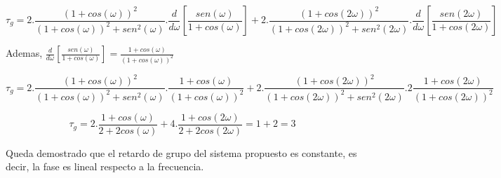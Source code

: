 \documentclass[../../ASSD_TP1_G7.tex]{subfiles}
\begin{document}
$$\tau_g =2.\frac{(1+cos(\omega))^2}{(1+cos(\omega))^2+sen^2(\omega)}.\frac{d}{d\omega}\left[\frac{sen(\omega)}{1+cos(\omega)}\right]+2.\frac{(1+cos(2\omega))^2}{(1+cos(2\omega))^2+sen^2(2\omega)}.\frac{d}{d\omega}\left[\frac{sen(2\omega)}{1+cos(2\omega)}\right]$$


Ademas, $\frac{d}{d\omega}\left[\frac{sen(\omega)}{1+cos(\omega)}\right]=\frac{1+cos(\omega)}{(1+cos(\omega))^2}$

$$\tau_g =2.\frac{(1+cos(\omega))^2}{(1+cos(\omega))^2+sen^2(\omega)}.\frac{1+cos(\omega)}{(1+cos(\omega))^2}+2.\frac{(1+cos(2\omega))^2}{(1+cos(2\omega))^2+sen^2(2\omega)}.2\frac{1+cos(2\omega)}{(1+cos(2\omega))^2}$$

$$\tau_g =2.\frac{1+cos(\omega)}{2+2cos(\omega)}+4.\frac{1+cos(2\omega)}{2+2cos(2\omega)}=1+2=3$$

Queda demostrado que el retardo de grupo del sistema propuesto es constante, es decir, la fase es lineal respecto a la frecuencia. 
\end{document}

